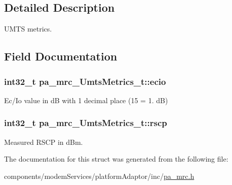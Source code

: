 \subsection{Detailed Description}
U\+M\+TS metrics. 

\subsection{Field Documentation}
\subsubsection[{\texorpdfstring{ecio}{ecio}}]{\setlength{\rightskip}{0pt plus 5cm}int32\+\_\+t pa\+\_\+mrc\+\_\+\+Umts\+Metrics\+\_\+t\+::ecio}\hypertarget{structpa__mrc___umts_metrics__t_a51ce610279899a58e28158e4bd457084}{}\label{structpa__mrc___umts_metrics__t_a51ce610279899a58e28158e4bd457084}


Ec/\+Io value in dB with 1 decimal place (15 = 1. dB) 

\subsubsection[{\texorpdfstring{rscp}{rscp}}]{\setlength{\rightskip}{0pt plus 5cm}int32\+\_\+t pa\+\_\+mrc\+\_\+\+Umts\+Metrics\+\_\+t\+::rscp}\hypertarget{structpa__mrc___umts_metrics__t_af9c3ed3a4d378dcbae464253b933d797}{}\label{structpa__mrc___umts_metrics__t_af9c3ed3a4d378dcbae464253b933d797}


Measured R\+S\+CP in d\+Bm. 



The documentation for this struct was generated from the following file\+:\begin{DoxyCompactItemize}
\item 
components/modem\+Services/platform\+Adaptor/inc/\hyperlink{pa__mrc_8h}{pa\+\_\+mrc.\+h}\end{DoxyCompactItemize}
